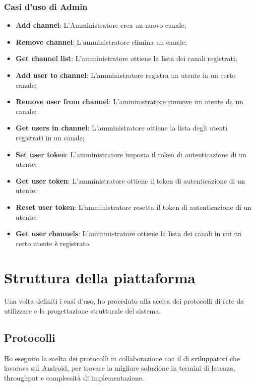 		\subsubsection{Casi d'uso di Admin}
		\begin{itemize}
			\item \textbf{Add channel}: L'Amministratore crea un nuovo canale;
			\item \textbf{Remove channel}: L'amministratore elimina un canale;
			\item \textbf{Get channel list}: L'amministratore ottiene la lista dei canali registrati;
			\item \textbf{Add user to channel}: L'amministratore registra un utente in un certo canale;
			\item \textbf{Remove user from channel}: L'amministratore rimuove un utente da un canale;
			\item \textbf{Get users in channel}: L'amministratore ottiene la lista degli utenti registrati in un canale;
			\item \textbf{Set user token}: L'amministratore imposta il token di autenticazione di un utente;
			\item \textbf{Get user token}: L'amministratore ottiene il token di autenticazione di un utente;
			\item \textbf{Reset user token}: L'amministratore resetta il token di autenticazione di un utente;
			\item \textbf{Get user channels}: L'amministratore ottiene la lista dei canali in cui un certo utente è registrato.
		\end{itemize}
		

\section{Struttura della piattaforma}
Una volta definiti i casi d'uso, ho proceduto alla scelta dei protocolli di rete da utilizzare e la progettazione strutturale del sistema.
	\subsection{Protocolli}
	Ho eseguito la scelta dei protocolli in collaborazione con il  di sviluppatori che lavorava sul  Android, per trovare la migliore soluzione in termini di latenza, throughput e complessità di implementazione.
